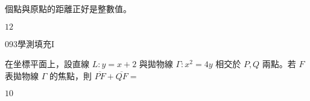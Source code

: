 \begin{QUESTIONS}
\begin{QUESTION}
\begin{QBODY}
            \TCNBOX{\TCN\TCN} 個點與原點的距離正好是整數值。
        \end{QBODY}
        \begin{QFROMS}
        \end{QFROMS}
        \begin{QTAGS}\end{QTAGS}
        \begin{QANS}
            $12$
        \end{QANS}
        \begin{QSOLLIST}
        \end{QSOLLIST}
        \begin{QEMPTYSPACE}
        \end{QEMPTYSPACE}
    \end{QUESTION}
    \begin{QUESTION}
        \begin{ExamInfo}{093}{學測}{填充}{I}
        \end{ExamInfo}
        \begin{ExamAnsRateInfo}{19}{47}{7}{3}
        \end{ExamAnsRateInfo}
        \begin{QBODY}
            在坐標平面上，設直線 $L:y=x+2$ 與拋物線 $\Gamma :x^2=4y$ 相交於 $P,Q$ 兩點。若 $F$ 表拋物線 $\Gamma$ 的焦點，則 $\overline{PF}+\overline{QF}=$ 
            \TCNBOX{\TCN\TCN}
        \end{QBODY}
        \begin{QFROMS}
        \end{QFROMS}
        \begin{QTAGS}\end{QTAGS}
        \begin{QANS}
            $10$
        \end{QANS}
        \begin{QSOLLIST}
        \end{QSOLLIST}
        \begin{QEMPTYSPACE}
        \end{QEMPTYSPACE}
    \end{QUESTION}
\end{QUESTIONS}
